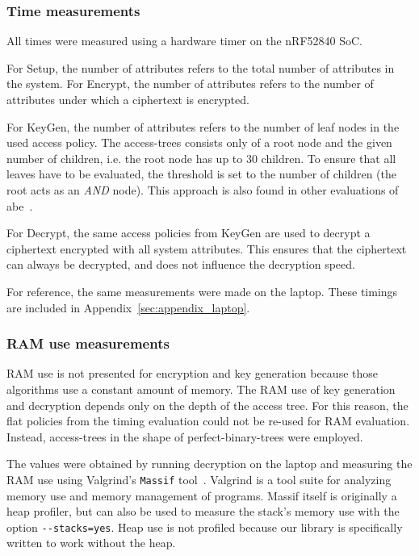 \subsubsection{Time measurements}


All times were measured using a hardware timer on the nRF52840 SoC.

For Setup, the number of attributes refers to the total number of attributes in the system.
For Encrypt, the number of attributes refers to the number of attributes under which a ciphertext is encrypted.

For KeyGen, the number of attributes refers to the number of leaf nodes in the used access policy.
The \glspl{access-tree} consists only of a root node and the given number of children, i.e. the root node has up to 30 children. 
To ensure that all leaves have to be evaluated, the threshold is set to the number of children (the root acts as an \emph{AND} node).
This approach is also found in other evaluations of \acrshort{abe}~\cite{girgenti_feasibility_2019}.

For Decrypt, the same access policies from KeyGen are used to decrypt a ciphertext encrypted with all system attributes.
This ensures that the ciphertext can always be decrypted, and does not influence the decryption speed.

For reference, the same measurements were made on the laptop.
These timings are included in Appendix~\ref{sec:appendix_laptop}.

\subsubsection{RAM use measurements}


RAM use is not presented for encryption and key generation because those algorithms use a constant amount of memory.
The RAM use of key generation and decryption depends only on the depth of the access tree.
For this reason, the flat policies from the timing evaluation could not be re-used for RAM evaluation.
Instead, \glspl{access-tree} in the shape of \glspl{perfect-binary-tree} were employed.

The values were obtained by running decryption on the laptop and measuring the RAM use using Valgrind's \texttt{Massif} tool~\cite{nethercote_massif_nodate}.
Valgrind is a tool suite for analyzing memory use and memory management of programs.
Massif itself is originally a heap profiler, but can also be used to measure the stack's memory use with the option \verb+--stacks=yes+.
Heap use is not profiled because our library is specifically written to work without the heap.

